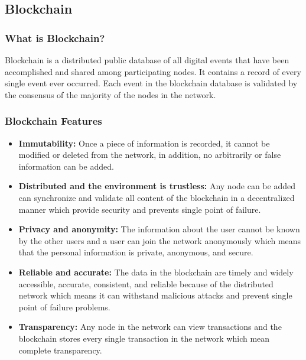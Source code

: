 			\newpage
			\subsection{Blockchain}
				\subsubsection{What is Blockchain?}
				Blockchain is a distributed public database of all digital events that have been accomplished and shared among participating nodes. It contains a record of every single event ever occurred. Each event in the blockchain database is validated by the consensus of the majority of the nodes in the network. 
				
				\subsubsection{Blockchain Features \cite{shrestha2020new}}
				\begin{itemize}
					\item \textbf{Immutability:} Once a piece of information is recorded, it cannot be modified or deleted from the network, in addition, no arbitrarily or false information can be added.
					\item \textbf{Distributed and the environment is trustless:} Any node can be added can synchronize and validate all content of the blockchain in a decentralized manner which provide security and prevents single point of failure.
					\item \textbf{Privacy and anonymity:} The information about the user cannot be known by the other users and a user can join the network anonymously which means that the personal information is private, anonymous, and secure.
					\item \textbf{Reliable and accurate:} The data in the blockchain are timely and widely accessible, accurate, consistent, and reliable because of the distributed network which means it can withstand malicious attacks and prevent single point of failure problems.
					\item \textbf{Transparency:} Any node in the network can view transactions and the blockchain stores every single transaction in the network which mean complete transparency.
				\end{itemize}
				
